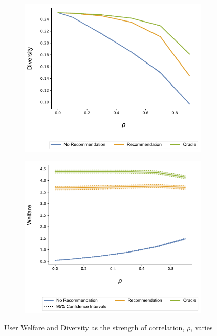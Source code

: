 \documentclass[format=acmsmall, review=false]{acmart}
\begin{document}
\begin{figure}
\begin{subfigure}{.45\linewidth}
  \includegraphics[width=.8\linewidth]{figures/rho_diversity_N_200_T_20.pdf}
\end{subfigure}
\begin{subfigure}{.45\linewidth}
  \includegraphics[width=.8\linewidth]{figures/rho_welfare_N_200_T_20.pdf}
\end{subfigure}
\caption{User Welfare and Diversity as the strength of correlation, $\rho$, varies}\label{fig:diversity_welfare_correlation}
\end{figure}
\end{document}
